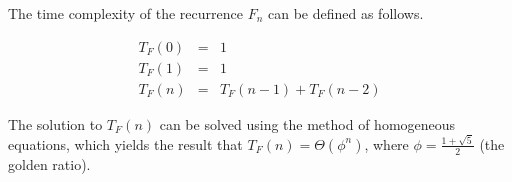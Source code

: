 \documentclass[11pt]{article}
\begin{document}
\begin{prob}{1}
\end{prob}
\begin{sol} 

The time complexity of the recurrence $F_{n}$ can be defined as follows.

\begin{eqnarray*}
T_{F}(0) & = & 1 \\
T_{F}(1) & = & 1 \\
T_{F}(n) & = & T_{F}(n-1) + T_{F}(n-2)
\end{eqnarray*}

The solution to $T_{F}(n)$ can be solved using the method of homogeneous equations, which yields the result that $T_{F}(n) = \Theta(\phi^{n})$, where $\phi = \frac{1 + \sqrt{5}}{2}$ (the golden ratio).

\end{sol}
\end{document}
